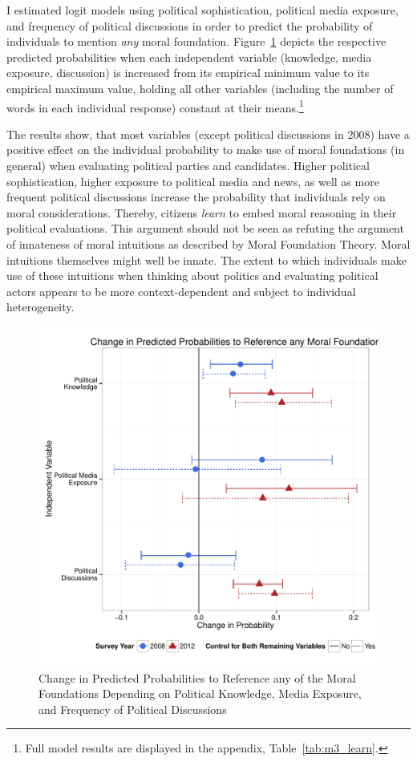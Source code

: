 \documentclass[12pt]{paper}
\begin{document}
I estimated logit models using political sophistication, political media exposure, and frequency of political discussions in order to predict the probability of individuals to mention \textit{any} moral foundation. Figure~\ref{fig:m3_learn} depicts the respective predicted probabilities when each independent variable (knowledge, media exposure, discussion) is increased from its empirical minimum value to its empirical maximum value, holding all other variables (including the number of words in each individual response) constant at their means.\footnote{Full model results are displayed in the appendix, Table~\ref{tab:m3_learn}.}

The results show, that most variables (except political discussions in 2008) have a positive effect on the individual probability to make use of moral foundations (in general) when evaluating political parties and candidates. Higher political sophistication, higher exposure to political media and news, as well as more frequent political discussions increase the probability that individuals rely on moral considerations. Thereby, citizens \textit{learn} to embed moral reasoning in their political evaluations. This argument should not be seen as refuting the argument of innateness of moral intuitions as described by Moral Foundation Theory. Moral intuitions themselves might well be innate. The extent to which individuals make use of these intuitions when thinking about politics and evaluating political actors appears to be more context-dependent and subject to individual heterogeneity.

\begin{figure}\centering
\includegraphics[scale=.6]{../calc/fig/m3_learn.pdf}
\caption{Change in Predicted Probabilities to Reference any of the Moral Foundations Depending on Political Knowledge, Media Exposure, and Frequency of Political Discussions}\label{fig:m3_learn}
\end{figure}
\end{document}

